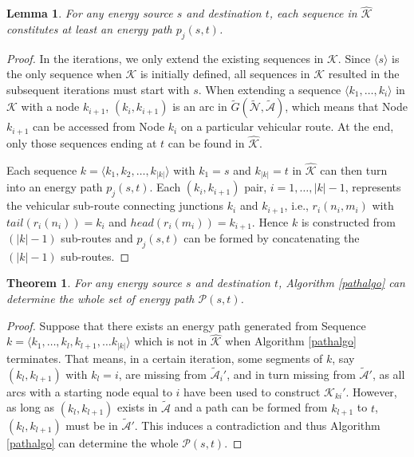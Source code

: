 \documentclass[journal]{IEEEtran}
\newtheorem{lemma}{\textbf{Lemma}}
\newtheorem{theorem}{\textbf{Theorem}}
\begin{document}
\begin{lemma}
For any energy source $s$ and destination $t$, each sequence in $\hat{\mathcal{K}}$ constitutes at least an energy path $p_j(s,t)$.
\end{lemma}
\begin{proof}
In the iterations, we only extend the existing sequences in $\mathcal{K}$. Since $\langle s \rangle$ is the only sequence when $\mathcal{K}$ is initially defined, all sequences in $\mathcal{K}$ resulted in the subsequent iterations must start with $s$. When extending a sequence $\langle k_1,\ldots,k_i \rangle$ in $\mathcal{K}$ with a node $k_{i+1}$, $(k_i,k_{i+1})$ is an arc in $\tilde{G}(\tilde{\mathcal{N}},\tilde{\mathcal{A}})$, which means that Node $k_{i+1}$ can be accessed from Node $k_i$ on a particular vehicular route. At the end, only those sequences ending at $t$ can be found in $\hat{\mathcal{K}}$.

Each sequence $k=\langle k_1,k_2,\ldots,k_{|k|} \rangle$ with $k_1=s$ and $k_{|k|}=t$ in $\hat{\mathcal{K}}$ can then turn into an energy path $p_j(s,t)$. Each $(k_i,k_{i+1})$ pair, $i=1,\ldots,|k|-1$, represents the vehicular sub-route connecting junctions $k_i$ and $k_{i+1}$, i.e., $r_i(n_i,m_i)$ with $tail(r_i(n_i))=k_i$ and $head(r_i(m_i))=k_{i+1}$. Hence $k$ is constructed from $(|k|-1)$ sub-routes and $p_j(s,t)$ can be formed by concatenating the $(|k|-1)$ sub-routes.
\end{proof}

\begin{theorem} \label{thm:path}
For any energy source $s$ and destination $t$, Algorithm \ref{pathalgo} can determine the whole set of energy path $\mathcal{P}(s,t)$. 
\end{theorem}
\begin{proof}
Suppose that there exists an energy path generated from Sequence $k=\langle k_1,\ldots, k_l,k_{l+1},\ldots k_{|k|}\rangle$ which is not in $\hat{\mathcal{K}}$ when Algorithm \ref{pathalgo} terminates. That means, in a certain iteration, some segments of $k$, say $(k_l,k_{l+1})$ with $k_l=i$, are missing from $\tilde{\mathcal{A}}_i'$, and in turn missing from $\tilde{\mathcal{A}}'$, as all arcs with a starting node equal to $i$ have been used to construct $\mathcal{K}_{ki}'$. However, as long as $(k_l,k_{l+1})$ exists in $\tilde{\mathcal{A}}$ and a path can be formed from $k_{l+1}$ to $t$, $(k_l,k_{l+1})$ must be in $\tilde{\mathcal{A}}'$. This induces a contradiction and thus Algorithm \ref{pathalgo} can determine the whole $\mathcal{P}(s,t)$.
\end{proof}
\end{document}
